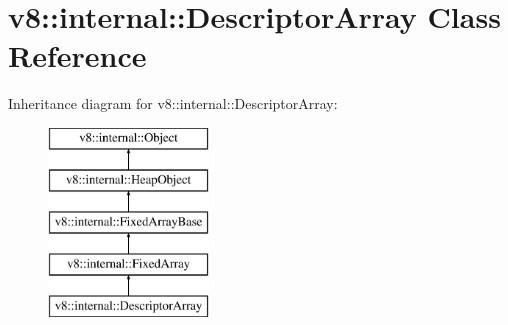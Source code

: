 \hypertarget{classv8_1_1internal_1_1_descriptor_array}{}\section{v8\+:\+:internal\+:\+:Descriptor\+Array Class Reference}
\label{classv8_1_1internal_1_1_descriptor_array}
Inheritance diagram for v8\+:\+:internal\+:\+:Descriptor\+Array\+:\begin{figure}[H]
\begin{center}
\leavevmode
\includegraphics[height=5.000000cm]{classv8_1_1internal_1_1_descriptor_array}
\end{center}
\end{figure}
